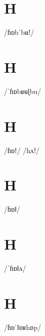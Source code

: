 \documentclass[10pt,a4paper,twoside]{book}
\begin{document}
\section*{H}

\begin{multicols}{3}
 {/ɦɒbˈbʉǃ/} {}
\end{multicols}

\section*{H}

\begin{multicols}{3}
 {/ˈɦɒbʁʉɭbu/} {}
\end{multicols}

\section*{H}

\begin{multicols}{3}
 {/ɦɒǃ/} {}
 {/hʌǃ/} {}
\end{multicols}

\section*{H}

\begin{multicols}{3}
 {/ɦɒǁ/} {}
\end{multicols}

\section*{H}

\begin{multicols}{3}
 {/ˈɦɒǁʌ/} {}
\end{multicols}

\section*{H}

\begin{multicols}{3}
 {/ɦɒˈǁɒʁhɒp/} {}
\end{multicols}
\end{document}
